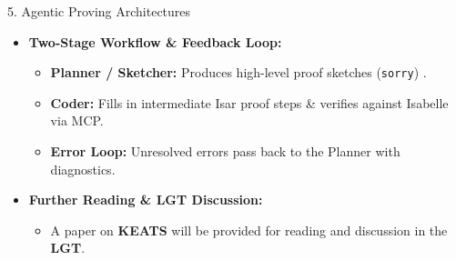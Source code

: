 \documentclass[compress,10pt,xcolor=dvipsnames]{beamer}
\begin{document}
\begin{frame}{5. Agentic Proving Architectures}
{\begin{center}
\end{center}
}

\vspace{-0.3em}
\begin{itemize}
  \item<2-> \textbf{Two-Stage Workflow \& Feedback Loop:}
    \begin{itemize}
      \item \textbf{Planner / Sketcher:} Produces high-level proof sketches (\texttt{sorry}) \citep{wendaLiSketchProveLLMs}.
      \item \textbf{Coder:} Fills in intermediate Isar proof steps \& verifies against Isabelle via MCP.
      \item \textbf{Error Loop:} Unresolved errors pass back to the Planner with diagnostics.
    \end{itemize}
  \vspace{0.3em}
  \item<3-> \textbf{Further Reading \& LGT Discussion:}
    \begin{itemize}
      \item A paper on \textbf{KEATS} will be provided for reading and discussion in the \textbf{LGT}.
    \end{itemize}
\end{itemize}
\end{frame}
\end{document}

